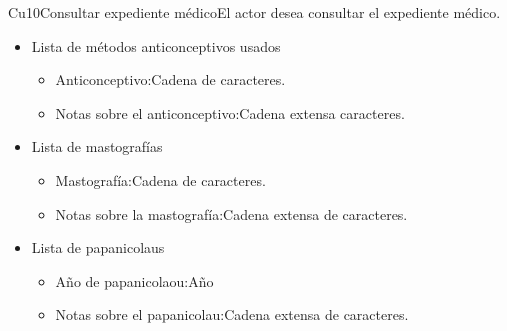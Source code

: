\begin{UseCase}{Cu10}{Consultar expediente médico}{El actor desea consultar el expediente médico.}
{\begin{itemize}
        \item Lista de métodos anticonceptivos usados
        
        \begin{itemize}
             \item Anticonceptivo:Cadena de caracteres.
            \item Notas sobre el anticonceptivo:Cadena extensa caracteres.
        \end{itemize}
            
        \item Lista de mastografías
        
        \begin{itemize}
            \item Mastografía:Cadena de caracteres.
            \item Notas sobre la mastografía:Cadena extensa de caracteres.
        \end{itemize}
            
        \item Lista de papanicolaus
        
        \begin{itemize}
            \item Año de papanicolaou:Año
            \item Notas sobre el papanicolau:Cadena extensa de caracteres.
        \end{itemize}
        
        \end{itemize}
}
\end{UseCase}
